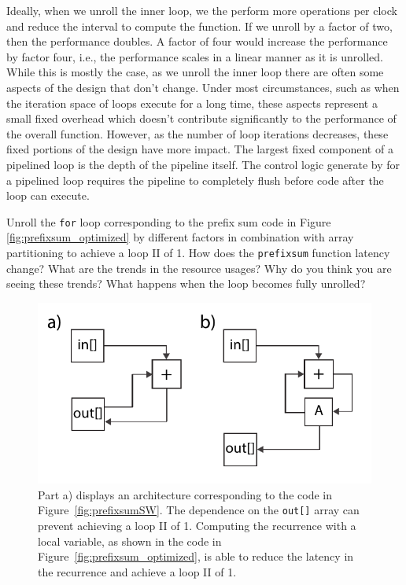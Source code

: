 %

%

Ideally, when we unroll the inner loop, we the perform more operations per clock and reduce the interval to compute the function. If we unroll by a factor of two, then the performance doubles. A factor of four would increase the performance by factor four, i.e., the performance scales in a linear manner as it is unrolled. While this is mostly the case, as we unroll the inner loop there are often some aspects of the design that don't change.  Under most circumstances, such as when the iteration space of loops execute for a long time, these aspects represent a small fixed overhead which doesn't contribute significantly to the performance of the overall function.  However, as the number of loop iterations decreases, these fixed portions of the design have more impact.  The largest fixed component of a pipelined loop is the depth of the pipeline itself.  The control logic generate by \VHLS for a pipelined loop requires the pipeline to completely flush before code after the loop can execute.

\begin{exercise}
Unroll the \lstinline{for} loop corresponding to the prefix sum code in Figure \ref{fig:prefixsum_optimized} by different factors in combination with array partitioning to achieve a loop II of 1.  How does the \lstinline{prefixsum} function latency change? What are the trends in the resource usages? Why do you think you are seeing these trends? What happens when the loop becomes fully unrolled?
\end{exercise}

\begin{figure}
\centering
\includegraphics[width=  .7\textwidth]{images/architectures_prefixsum}
\caption{ Part a) displays an architecture corresponding to the code in Figure~\ref{fig:prefixsumSW}. The dependence on the \lstinline{out[]} array can prevent achieving a loop II of 1. Computing the recurrence with a local variable, as shown in the code in Figure~\ref{fig:prefixsum_optimized}, is able to reduce the latency in the recurrence and achieve a loop II of 1.}
\label{fig:architecture_prefixsum}
\end{figure}

